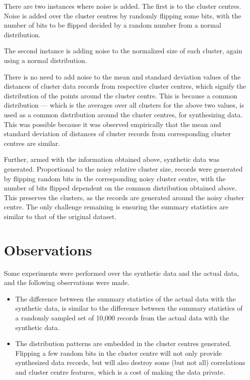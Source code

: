 \documentclass[]{article}
\begin{document}
There are two instances where noise is added. The first is to the cluster centres. Noise is added over the cluster centres by randomly flipping some bits, with the number of bits to be flipped decided by a random number from a normal distribution.

The second instance is adding noise to the normalized size of each cluster, again using a normal distribution.

There is no need to add noise to the mean and standard deviation values of the distances of cluster data records from respective cluster centres, which signify the distribution of the points around the cluster centre. This is because a common distribution --- which is the averages over all clusters for the above two values, is used as a common distribution around the cluster centres, for synthesizing data. This was possible because it was observed empirically that the mean and standard deviation of distances of cluster records from corresponding cluster centres are similar.  

Further, armed with the information obtained above, synthetic data was generated. Proportional to the noisy relative cluster size, records were generated by flipping random bits in the corresponding noisy cluster centre, with the number of bits flipped dependent on the common distribution obtained above. This preserves the clusters, as the records are generated around the noisy cluster centre. The only challenge remaining is ensuring the summary statistics are similar to that of the original dataset.

\section{Observations}

Some experiments were performed over the synthetic data and the actual data, and the following observations were made.

\begin{itemize}
    \item The difference between the summary statistics of the actual data with the synthetic data, is similar to the difference between the summary statistics of a randomly sampled set of 10,000 records from the actual data with the synthetic data.
    \item The distribution patterns are embedded in the cluster centres generated. Flipping a few random bits in the cluster centre will not only provide synthesized data records, but will also destroy some (but not all) correlations and cluster centre features, which is a cost of making the data private.
    
\end{itemize}
\end{document}

